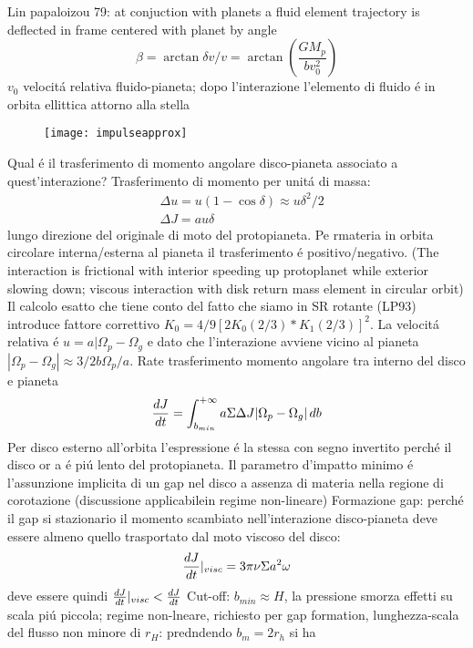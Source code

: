 \begin{workout}
Lin papaloizou 79: at conjuction with planets a fluid element trajectory is deflected in frame centered with planet by angle
\begin{equation}
\beta=\arctan{\delta v/v}=\arctan{(\frac{GM_p}{bv_0^2})}
\end{equation}
$v_0$ velocit\'a relativa fluido-pianeta; dopo l'interazione l'elemento di fluido \'e in orbita ellittica attorno alla stella
\begin{figure}[!t]
\texttt{[image: impulseapprox]}
\end{figure}
Qual \'e il trasferimento di momento angolare disco-pianeta associato a quest'interazione?
Trasferimento di momento per unit\'a di massa:
\begin{align}
&\Delta u=u(1-\cos{\delta})\approx u\delta^2/2\\
&\Delta J=au\delta
\end{align}
lungo direzione del originale di moto del protopianeta.
Pe rmateria in orbita circolare interna/esterna al pianeta il trasferimento \'e positivo/negativo.
(The interaction is frictional with interior speeding up protoplanet while exterior slowing down; viscous interaction with disk return mass element in circular orbit)
Il calcolo esatto che tiene conto del fatto che siamo in SR rotante (LP93) introduce fattore correttivo $K_0=4/9[2K_0(2/3)*K_1(2/3)]^2$.
La velocit\'a relativa \'e $u=a|\Omega_p-\Omega_g$ e dato che l'interazione avviene vicino al pianeta $|\Omega_p-\Omega_g|\approx3/2b\Omega_p/a$.
Rate trasferimento momento angolare tra interno del disco e pianeta
\begin{equation}
\TDy{t}{J}=\int_{b_{min}}^{+\infty}a\Sigma\Delta J|\Omega_p-\Omega_g|\,db
\end{equation}
Per disco esterno all'orbita l'espressione \'e la stessa con segno invertito perch\'e il disco or a \'e pi\'u lento del protopianeta.
Il parametro d'impatto minimo \'e l'assunzione implicita di un gap nel disco a assenza di materia nella regione di corotazione (discussione applicabilein regime non-lineare)
Formazione gap: perch\'e il gap si stazionario il momento scambiato nell'interazione disco-pianeta deve essere almeno quello trasportato dal moto viscoso del disco:
\begin{equation}
\TDy{t}{J}|_{visc}=3\pi\nu\Sigma a^2\omega
\end{equation}
deve essere quindi $\TDy{t}{J}|_{visc}<\TDy{t}{J}$
Cut-off: $b_{min}\approx H$, la pressione smorza effetti su scala pi\'u piccola; regime non-lneare, richiesto per gap formation, lunghezza-scala del flusso non minore di $r_H$: predndendo $b_m=2r_h$ si ha

\end{workout}
